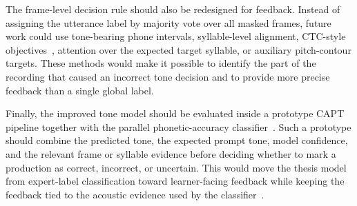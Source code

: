 The frame-level decision rule should also be redesigned for feedback. Instead
of assigning the utterance label by majority vote over all masked frames, future
work could use tone-bearing phone intervals, syllable-level alignment,
CTC-style objectives~\cite{fan2023ctcbert}, attention over the expected target
syllable, or auxiliary pitch-contour targets. These methods would make it
possible to identify the part of the recording that caused an incorrect tone
decision and to provide more precise feedback than a single global label.

Finally, the improved tone model should be evaluated inside a prototype CAPT
pipeline together with the parallel phonetic-accuracy
classifier~\cite{brzeski2025mprp}. Such a prototype should combine the predicted
tone, the expected prompt tone, model confidence, and the relevant frame or
syllable evidence before deciding whether to mark a production as correct,
incorrect, or uncertain. This would move the thesis model from expert-label
classification toward learner-facing feedback while keeping the feedback tied to
the acoustic evidence used by the classifier~\cite{rogerson2021,neri2002}.
